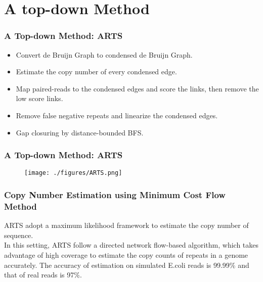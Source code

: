 \documentclass[mathserif]{beamer}
\begin{document}
	
	\section{A top-down Method}
		\begin{frame}
			\frametitle{A Top-down Method: ARTS}
			\begin{itemize}
				\item Convert de Bruijn Graph to condensed de Bruijn Graph.
				\item Estimate the copy number of every condensed edge.
				\item Map paired-reads to the condensed edges and score the links, then remove the low score links.
				\item Remove false negative repeats and linearize the condensed edges.
				\item Gap closuring by distance-bounded BFS. 
			\end{itemize}
		\end{frame}
		
		\begin{frame}
		\frametitle{A Top-down Method: ARTS}
			\begin{figure}
				\centering
				\texttt{[image: ./figures/ARTS.png]}
			\end{figure}
			
		\end{frame}				
		
		\begin{frame}
	\frametitle{Copy Number Estimation using Minimum Cost Flow Method}
	
	ARTS adopt a maximum likelihood framework to estimate the copy number of sequence.\\
	In this setting, ARTS follow a directed network flow-based algorithm, which takes advantage of high coverage to estimate the copy counts of repeats in a genome accurately.
	The accuracy of estimation on simulated E.coli reads is 99.99\% and that of real reads is 97\%.

	\end{frame}
	
\end{document}
